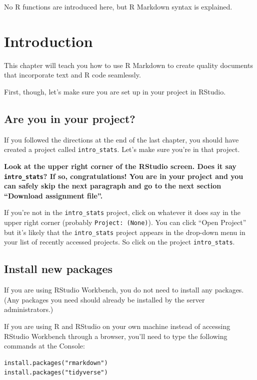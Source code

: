 \documentclass[
]{book}
\begin{document}
No R functions are introduced here, but R Markdown syntax is explained.

\hypertarget{rmark-intro}{%
\section{Introduction}\label{rmark-intro}}

This chapter will teach you how to use R Markdown to create quality documents that incorporate text and R code seamlessly.

First, though, let's make sure you are set up in your project in RStudio.

\hypertarget{rmark-project}{%
\subsection{Are you in your project?}\label{rmark-project}}

If you followed the directions at the end of the last chapter, you should have created a project called \texttt{intro\_stats}. Let's make sure you're in that project.

\textbf{Look at the upper right corner of the RStudio screen. Does it say \texttt{intro\_stats}? If so, congratulations! You are in your project and you can safely skip the next paragraph and go to the next section ``Download assignment file''.}

If you're not in the \texttt{intro\_stats} project, click on whatever it does say in the upper right corner (probably \texttt{Project:\ (None)}). You can click ``Open Project'' but it's likely that the \texttt{intro\_stats} project appears in the drop-down menu in your list of recently accessed projects. So click on the project \texttt{intro\_stats}.

\hypertarget{rmark-install}{%
\subsection{Install new packages}\label{rmark-install}}

If you are using RStudio Workbench, you do not need to install any packages. (Any packages you need should already be installed by the server administrators.)

If you are using R and RStudio on your own machine instead of accessing RStudio Workbench through a browser, you'll need to type the following commands at the Console:

\begin{verbatim}
install.packages("rmarkdown")
install.packages("tidyverse")
\end{verbatim}
\end{document}
